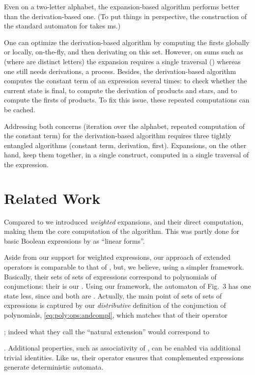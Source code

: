 \documentclass[a4paper,USenglish]{lipics}
\begin{document}
Even on a two-letter alphabet, the expansion-based algorithm performs better
than the derivation-based one. (To put things in perspective, the
construction of the standard automaton for  takes ms.)


One can optimize the derivation-based algorithm by computing the firsts
globally \citep{owens.2009.jfp} or locally, on-the-fly, and then derivating
on this set.  However, on sums such as  (where  are
distinct letters) the expansion requires a single traversal () whereas
one still needs  derivations, a  process.
Besides, the derivation-based algorithm computes the constant term of an
expression several times: to check whether the current state is final, to
compute the derivation of products and stars, and to compute the firsts of
products.  To fix this issue, these repeated computations can be cached.

Addressing both concerns (iteration over the alphabet, repeated computation
of the constant term) for the derivation-based algorithm requires three
tightly entangled algorithms (constant term, derivation, first).
Expansions, on the other hand, keep them together, in a single construct,
computed in a single traversal of the expression.




\section{Related Work}
\label{sec:related}
Compared to \citet{brzozowski.64.jacm} we introduced \emph{weighted}
expansions, and their direct computation, making them the core computation
of the algorithm.  This was partly done for basic Boolean expressions by
\citet{antimirov.1996.tcs} as ``linear forms''.

Aside from our support for weighted expressions, our approach of extended
operators is comparable to that of \citet{caron.2011.lata.2}, but, we
believe, using a simpler framework.  Basically, their sets of sets of
expressions correspond to polynomials of conjunctions: their
 is our .
Using our framework, the automaton of Fig.~3 \citep{caron.2011.lata.2} has
one state less, since  and  both are
.  Actually, the main point of sets of sets of expressions is
captured by our \emph{distributive} definition of the conjunction of
polynomials, \cref{eq:poly:ops:andcompl}, which matches that of their
\raisebox{1pt}{\scalebox{.7}{\circled{}}} operator\begin{longenv}
  ; indeed what they call the ``natural extension''
  \citep[Sect.~3.1]{caron.2011.lata.2} would correspond to
  
\end{longenv}
.  Additional properties, such as associativity of , can be enabled
via additional trivial identities.  Like us, their
\raisebox{1pt}{\scalebox{.7}{\circled{}}} operator ensures that
complemented expressions generate deterministic automata.
\end{document}
